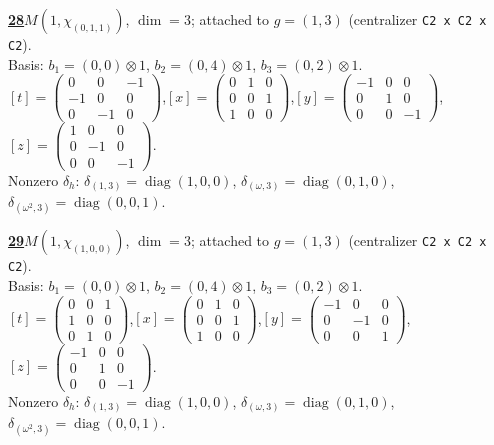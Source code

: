\begin{samepage}\noindent\textbf{\underline{28}}\quad $M(1,\chi_{(0,1,1)})$, $\dim=3$; attached to $g=(1,3)$ (centralizer \texttt{C2 x C2 x C2}).\\
Basis: $b_{1}=(0,0)\otimes 1$, $b_{2}=(0,4)\otimes 1$, $b_{3}=(0,2)\otimes 1$.\\
$[t]=\left(\begin{smallmatrix} 0 & 0 & -1 \\ -1 & 0 & 0 \\ 0 & -1 & 0 \end{smallmatrix}\right)$,\quad $[x]=\left(\begin{smallmatrix} 0 & 1 & 0 \\ 0 & 0 & 1 \\ 1 & 0 & 0 \end{smallmatrix}\right)$,\quad $[y]=\left(\begin{smallmatrix} -1 & 0 & 0 \\ 0 & 1 & 0 \\ 0 & 0 & -1 \end{smallmatrix}\right)$,\quad $[z]=\left(\begin{smallmatrix} 1 & 0 & 0 \\ 0 & -1 & 0 \\ 0 & 0 & -1 \end{smallmatrix}\right)$.\\
Nonzero $\delta_h$: $\delta_{(1,3)}=\operatorname{diag}(1,0,0)$, $\delta_{(\omega,3)}=\operatorname{diag}(0,1,0)$, $\delta_{(\omega^2,3)}=\operatorname{diag}(0,0,1)$.\end{samepage}
\medskip

\begin{samepage}\noindent\textbf{\underline{29}}\quad $M(1,\chi_{(1,0,0)})$, $\dim=3$; attached to $g=(1,3)$ (centralizer \texttt{C2 x C2 x C2}).\\
Basis: $b_{1}=(0,0)\otimes 1$, $b_{2}=(0,4)\otimes 1$, $b_{3}=(0,2)\otimes 1$.\\
$[t]=\left(\begin{smallmatrix} 0 & 0 & 1 \\ 1 & 0 & 0 \\ 0 & 1 & 0 \end{smallmatrix}\right)$,\quad $[x]=\left(\begin{smallmatrix} 0 & 1 & 0 \\ 0 & 0 & 1 \\ 1 & 0 & 0 \end{smallmatrix}\right)$,\quad $[y]=\left(\begin{smallmatrix} -1 & 0 & 0 \\ 0 & -1 & 0 \\ 0 & 0 & 1 \end{smallmatrix}\right)$,\quad $[z]=\left(\begin{smallmatrix} -1 & 0 & 0 \\ 0 & 1 & 0 \\ 0 & 0 & -1 \end{smallmatrix}\right)$.\\
Nonzero $\delta_h$: $\delta_{(1,3)}=\operatorname{diag}(1,0,0)$, $\delta_{(\omega,3)}=\operatorname{diag}(0,1,0)$, $\delta_{(\omega^2,3)}=\operatorname{diag}(0,0,1)$.\end{samepage}
\medskip

